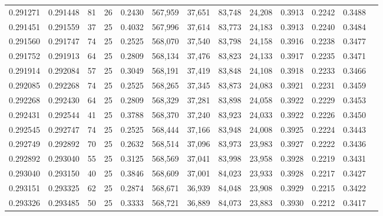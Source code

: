 \begin{tabular}{rrrrrrrrrrrrr}
0.291271 & 0.291448 &    81 &  26 &                                     0.2430 & 567,959 &  37,651 &  83,748 &  24,208 & 0.3913 & 0.2242 & 0.3488 \\
0.291451 & 0.291559 &    37 &  25 &                                     0.4032 & 567,996 &  37,614 &  83,773 &  24,183 & 0.3913 & 0.2240 & 0.3484 \\
0.291560 & 0.291747 &    74 &  25 &                                     0.2525 & 568,070 &  37,540 &  83,798 &  24,158 & 0.3916 & 0.2238 & 0.3477 \\
0.291752 & 0.291913 &    64 &  25 &                                     0.2809 & 568,134 &  37,476 &  83,823 &  24,133 & 0.3917 & 0.2235 & 0.3471 \\
0.291914 & 0.292084 &    57 &  25 &                                     0.3049 & 568,191 &  37,419 &  83,848 &  24,108 & 0.3918 & 0.2233 & 0.3466 \\
0.292085 & 0.292268 &    74 &  25 &                                     0.2525 & 568,265 &  37,345 &  83,873 &  24,083 & 0.3921 & 0.2231 & 0.3459 \\
0.292268 & 0.292430 &    64 &  25 &                                     0.2809 & 568,329 &  37,281 &  83,898 &  24,058 & 0.3922 & 0.2229 & 0.3453 \\
0.292431 & 0.292544 &    41 &  25 &                                     0.3788 & 568,370 &  37,240 &  83,923 &  24,033 & 0.3922 & 0.2226 & 0.3450 \\
0.292545 & 0.292747 &    74 &  25 &                                     0.2525 & 568,444 &  37,166 &  83,948 &  24,008 & 0.3925 & 0.2224 & 0.3443 \\
0.292749 & 0.292892 &    70 &  25 &                                     0.2632 & 568,514 &  37,096 &  83,973 &  23,983 & 0.3927 & 0.2222 & 0.3436 \\
0.292892 & 0.293040 &    55 &  25 &                                     0.3125 & 568,569 &  37,041 &  83,998 &  23,958 & 0.3928 & 0.2219 & 0.3431 \\
0.293040 & 0.293150 &    40 &  25 &                                     0.3846 & 568,609 &  37,001 &  84,023 &  23,933 & 0.3928 & 0.2217 & 0.3427 \\
0.293151 & 0.293325 &    62 &  25 &                                     0.2874 & 568,671 &  36,939 &  84,048 &  23,908 & 0.3929 & 0.2215 & 0.3422 \\
0.293326 & 0.293485 &    50 &  25 &                                     0.3333 & 568,721 &  36,889 &  84,073 &  23,883 & 0.3930 & 0.2212 & 0.3417 \\

\end{tabular}
